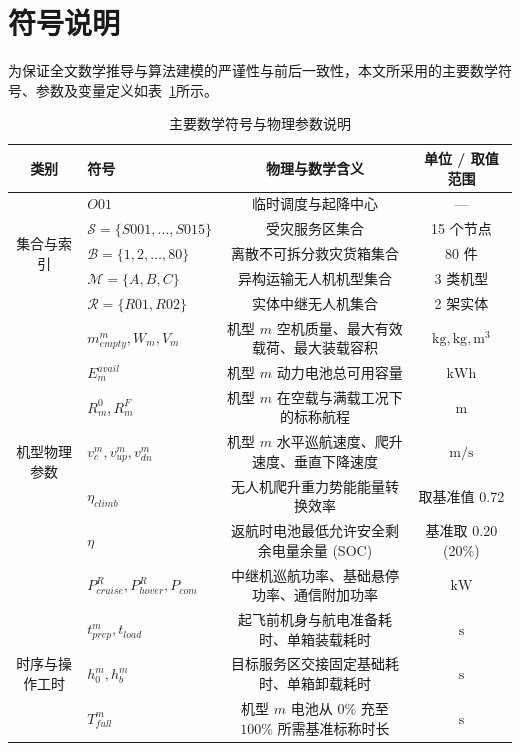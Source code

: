 \section{符号说明}

为保证全文数学推导与算法建模的严谨性与前后一致性，本文所采用的主要数学符号、参数及变量定义如表~\ref{tab:symbols}所示。

\begin{table}[htbp]
  \centering
  \caption{主要数学符号与物理参数说明}
  \label{tab:symbols}
  \fontsize{10pt}{13.5pt}\selectfont
  \begin{tabular}{clcc}
    \toprule
    \textbf{类别} & \textbf{符号} & \textbf{物理与数学含义} & \textbf{单位 / 取值范围} \\
    \midrule
    \multirow{5}{*}{集合与索引} 
    & $O01$ & 临时调度与起降中心 & --- \\
    & $\mathcal{S} = \{S001, \dots, S015\}$ & 受灾服务区集合 & 15 个节点 \\
    & $\mathcal{B} = \{1, 2, \dots, 80\}$ & 离散不可拆分救灾货箱集合 & 80 件 \\
    & $\mathcal{M} = \{A, B, C\}$ & 异构运输无人机机型集合 & 3 类机型 \\
    & $\mathcal{R} = \{R01, R02\}$ & 实体中继无人机集合 & 2 架实体 \\
    \midrule
    \multirow{7}{*}{机型物理参数} 
    & $m_{empty}^m, W_m, V_m$ & 机型 $m$ 空机质量、最大有效载荷、最大装载容积 & $\text{kg}, \text{kg}, \text{m}^3$ \\
    & $E_m^{avail}$ & 机型 $m$ 动力电池总可用容量 & $\text{kWh}$ \\
    & $R_m^0, R_m^F$ & 机型 $m$ 在空载与满载工况下的标称航程 & $\text{m}$ \\
    & $v_c^m, v_{up}^m, v_{dn}^m$ & 机型 $m$ 水平巡航速度、爬升速度、垂直下降速度 & $\text{m/s}$ \\
    & $\eta_{climb}$ & 无人机爬升重力势能能量转换效率 & 取基准值 0.72 \\
    & $\eta$ & 返航时电池最低允许安全剩余电量余量 (SOC) & 基准取 0.20 (20\%) \\
    & $P_{cruise}^R, P_{hover}^R, P_{com}$ & 中继机巡航功率、基础悬停功率、通信附加功率 & $\text{kW}$ \\
    \midrule
    \multirow{5}{*}{时序与操作工时} 
    & $t_{prep}^m, t_{load}$ & 起飞前机身与航电准备耗时、单箱装载耗时 & $\text{s}$ \\
    & $h_0^m, h_b^m$ & 目标服务区交接固定基础耗时、单箱卸载耗时 & $\text{s}$ \\
    & $T_{full}^m$ & 机型 $m$ 电池从 $0\%$ 充至 $100\%$ 所需基准标称时长 & $\text{s}$ \\

\end{tabular}
\end{table}
